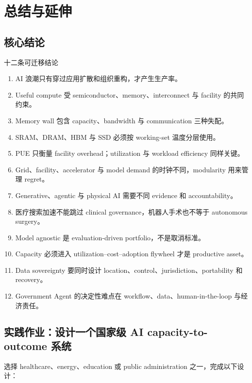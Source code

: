 \section{总结与延伸}

\subsection{核心结论}

\begin{importantbox}{十二条可迁移结论}
\begin{enumerate}
  \item AI 浪潮只有穿过应用扩散和组织重构，才产生生产率。
  \item Useful compute 受 semiconductor、memory、interconnect 与 facility 的共同约束。
  \item Memory wall 包含 capacity、bandwidth 与 communication 三种失配。
  \item SRAM、DRAM、HBM 与 SSD 必须按 working-set 温度分层使用。
  \item PUE 只衡量 facility overhead；utilization 与 workload efficiency 同样关键。
  \item Grid、facility、accelerator 与 model demand 的时钟不同，modularity 用来管理 regret。
  \item Generative、agentic 与 physical AI 需要不同 evidence 和 accountability。
  \item 医疗搜索加速不能跳过 clinical governance，机器人手术也不等于 autonomous surgery。
  \item Model agnostic 是 evaluation-driven portfolio，不是取消标准。
  \item Capacity 必须进入 utilization--cost--adoption flywheel 才是 productive asset。
  \item Data sovereignty 要同时设计 location、control、jurisdiction、portability 和 recovery。
  \item Government Agent 的决定性难点在 workflow、data、human-in-the-loop 与经济责任。
\end{enumerate}
\end{importantbox}

\subsection{实践作业：设计一个国家级 AI capacity-to-outcome 系统}

选择 healthcare、energy、education 或 public administration 之一，完成以下设计：

